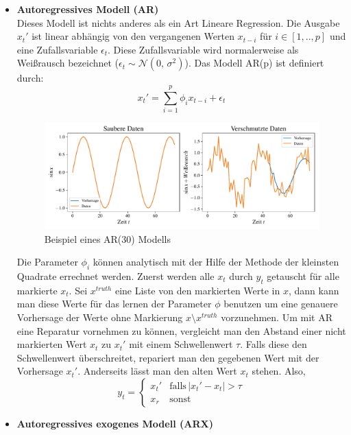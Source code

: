 \begin{itemize}
  \item \textbf{Autoregressives Modell (AR)}\\
  Dieses Modell ist nichts anderes als ein Art Lineare Regression. Die Ausgabe $x_t'$
  ist linear abhängig von den vergangenen Werten $x_{t-i}$ für $i\in[1,..,p]$ und
  eine Zufallsvariable $\epsilon_t$. Diese Zufallsvariable wird normalerweise
  als Weißrausch bezeichnet ($\epsilon_t \sim \mathcal{N}(0,\,\sigma^{2}) $).
  Das Modell AR(p) ist definiert durch:
  \[
  x_t'=\sum_{i=1}^{p}\phi_ix_{t-i}+\epsilon_t
  \] 
  \begin{figure}[h]
      \centering
      \includegraphics[width=\textwidth,keepaspectratio]{../plots/ar_sauber_verschmutze_daten.pdf}
      \caption{Beispiel eines AR(30) Modells}
  \end{figure}
  Die Parameter $\phi_i$ können analytisch mit der Hilfe der Methode der
  kleinsten Quadrate errechnet werden. Zuerst werden alle $x_t$ durch $y_t$
  getauscht für alle markierte $x_t$. Sei $x^{truth}$ eine Liste von den
  markierten Werte in $x$, dann kann man diese Werte für das lernen der
  Parameter $\phi$ benutzen um eine genauere Vorhersage der Werte ohne
  Markierung $x\setminus x^{truth}$ vorzunehmen. Um mit AR eine Reparatur
  vornehmen zu können, vergleicht man den Abstand einer nicht markierten Wert
  $x_t$ zu $x_t'$ mit einem Schwellenwert $\tau$. Falls diese den Schwellenwert
  überschreitet, repariert man den gegebenen Wert mit der Vorhersage $x_t'$.
  Anderseits lässt man den alten Wert $x_t$ stehen. Also,
  \[
    y_t= 
    \begin{cases}
    x_t'& \text{falls} \,|x_t'-x_t|>\tau\\
    x_r              & \text{sonst}
    \end{cases}
  \]
    \item \textbf{Autoregressives exogenes Modell (ARX)}\\
    \begin{figure}[h]
      \centering

\end{figure}
\end{itemize}
